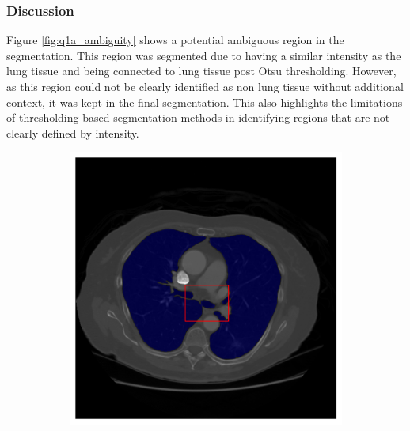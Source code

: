 \documentclass[11pt]{article}
\begin{document}
\subsubsection{Discussion}
Figure \ref{fig:q1a_ambiguity} shows a potential ambiguous region in the segmentation. This region was segmented due to having a similar intensity as the lung tissue and being connected to lung tissue post Otsu thresholding. However, as this region could not be clearly identified as non lung tissue without additional context, it was kept in the final segmentation. This also highlights the limitations of thresholding based segmentation methods in identifying regions that are not clearly defined by intensity.
\begin{figure}[H]
    \centering
    \begin{subfigure}{.4\textwidth}
        \centering
        \includegraphics[width=\linewidth]{figs/q1a_seg_w_bbox.png}  %
        \caption{}
        \label{fig:q1a_seg_w_bbox}
    \end{subfigure}%
    \begin{subfigure}{.4\textwidth}
        \centering

\end{subfigure}
\end{figure}
\end{document}
